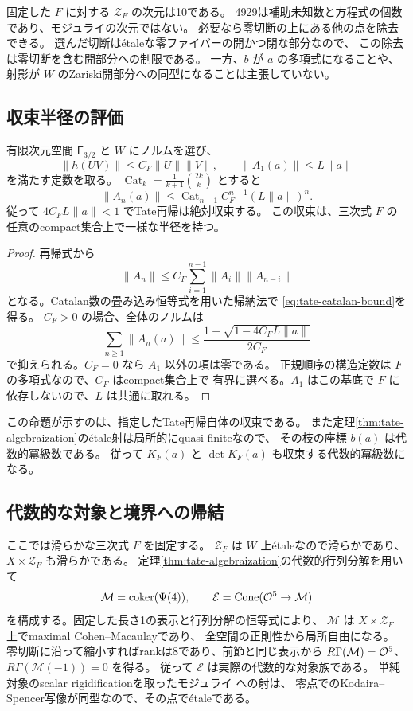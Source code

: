 \begin{remark}[\'etale近傍の意味]
固定した $F$ に対する $\mathcal Z_F$ の次元は10である。
4929は補助未知数と方程式の個数であり、モジュライの次元ではない。
必要なら零切断の上にある他の点を除去できる。
選んだ切断は\'etaleな零ファイバーの開かつ閉な部分なので、
この除去は零切断を含む開部分への制限である。
一方、$b$ が $a$ の多項式になることや、射影が
$W$ のZariski開部分への同型になることは主張していない。
\end{remark}

\subsection{収束半径の評価}

\begin{proposition}[Catalan数による収束評価]
\label{prop:tate-catalan-convergence}
有限次元空間 $\mathsf E_{3/2}$ と $W$ にノルムを選び、
\[
 \|h(UV)\|\le C_F\|U\|\|V\|,
 \qquad \|A_1(a)\|\le L\|a\|
\]
を満たす定数を取る。
$\operatorname{Cat}_k=\frac1{k+1}\binom{2k}k$ とすると
\[
 \|A_n(a)\|
 \le\operatorname{Cat}_{n-1}C_F^{n-1}(L\|a\|)^n.
 \tag{A3}\label{eq:tate-catalan-bound}
\]
従って $4C_FL\|a\|<1$ でTate再帰は絶対収束する。
この収束は、三次式 $F$ の任意のcompact集合上で一様な半径を持つ。
\end{proposition}
\begin{proof}
再帰式から
\[
 \|A_n\|\le C_F\sum_{i=1}^{n-1}\|A_i\|\|A_{n-i}\|
\]
となる。Catalan数の畳み込み恒等式を用いた帰納法で
\eqref{eq:tate-catalan-bound}を得る。
$C_F>0$ の場合、全体のノルムは
\[
 \sum_{n\ge1}\|A_n(a)\|
 \le\frac{1-\sqrt{1-4C_FL\|a\|}}{2C_F}
\]
で抑えられる。$C_F=0$ なら $A_1$ 以外の項は零である。
正規順序の構造定数は $F$ の多項式なので、$C_F$ はcompact集合上で
有界に選べる。$A_1$ はこの基底で $F$ に依存しないので、$L$ は共通に取れる。
\end{proof}

この命題が示すのは、指定したTate再帰自体の収束である。
また定理\ref{thm:tate-algebraization}の\'etale射は局所的にquasi-finiteなので、
その枝の座標 $b(a)$ は代数的冪級数である。
従って $K_F(a)$ と $\det K_F(a)$ も収束する代数的冪級数になる。

\subsection{代数的な対象と境界への帰結}

ここでは滑らかな三次式 $F$ を固定する。
$\mathcal Z_F$ は $W$ 上\'etaleなので滑らかであり、
$X\times\mathcal Z_F$ も滑らかである。
定理\ref{thm:tate-algebraization}の代数的行列分解を用いて
\[
 \mathcal M=\operatorname{coker}(\Psi(4)),\qquad
 \mathcal E=\operatorname{Cone}(\mathcal O^5\to\mathcal M)
\]
を構成する。固定した長さ1の表示と行列分解の恒等式により、
$\mathcal M$ は $X\times\mathcal Z_F$ 上でmaximal Cohen--Macaulayであり、
全空間の正則性から局所自由になる。
零切断に沿って縮小すればrankは8であり、前節と同じ表示から
$R\Gamma(\mathcal M)=\mathcal O^5$、$R\Gamma(\mathcal M(-1))=0$ を得る。
従って $\mathcal E$ は実際の代数的な対象族である。
単純対象のscalar rigidificationを取ったモジュライ
\cite[Theorem 4.2.1, Corollary 4.3.3]{LieblichComplexes}への射は、
零点でのKodaira--Spencer写像が同型なので、その点で\'etaleである。


